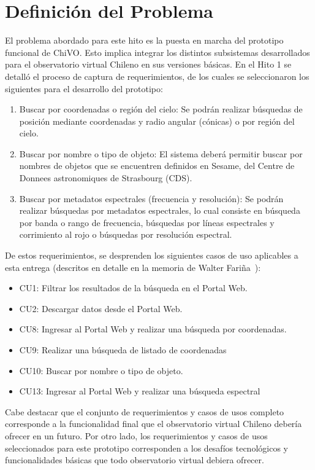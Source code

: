 \section{Definición del Problema}

El problema abordado para este hito es la puesta en marcha
del prototipo funcional de ChiVO. Esto implica integrar los
distintos subsistemas desarrollados para el observatorio
virtual Chileno en sus versiones básicas. En el Hito 1 
se detalló el proceso de captura de requerimientos, de 
los cuales se seleccionaron los siguientes para el 
desarrollo del prototipo:

\begin{enumerate}
\item Buscar por coordenadas o región del cielo:
Se podrán realizar búsquedas de posición mediante coordenadas y radio angular
(cónicas) o por región del cielo.
\item Buscar por nombre o tipo de objeto:
El sistema deberá permitir buscar por nombres de objetos que se encuentren
definidos en Sesame, del Centre de Donnees astronomiques de Strasbourg (CDS).
\item Buscar por metadatos espectrales (frecuencia y resolución): 
Se podrán realizar búsquedas por metadatos espectrales, lo cual consiste en
búsqueda por banda o rango de frecuencia, búsquedas por líneas espectrales y 
corrimiento al rojo o búsquedas por resolución espectral.
\end{enumerate}

De estos requerimientos, se desprenden los siguientes casos 
de uso aplicables a esta entrega
(descritos en detalle en la memoria de Walter Fariña~\cite{wfar}):
\begin{itemize}
\item CU1: Filtrar los resultados de la búsqueda en el Portal Web.
\item CU2: Descargar datos desde el Portal Web.
\item CU8: Ingresar al Portal Web y realizar una búsqueda por coordenadas.
\item CU9: Realizar una búsqueda de listado de coordenadas
\item CU10: Buscar por nombre o tipo de objeto.
\item CU13: Ingresar al Portal Web y realizar una búsqueda espectral
\end{itemize}

Cabe destacar que el conjunto de requerimientos y casos de usos completo
corresponde a la funcionalidad final que el observatorio virtual Chileno
debería ofrecer en un futuro. Por otro lado, los requerimientos y casos de usos seleccionados
para este prototipo corresponden a los desafíos tecnológicos y funcionalidades
básicas que todo observatorio virtual debiera ofrecer.

